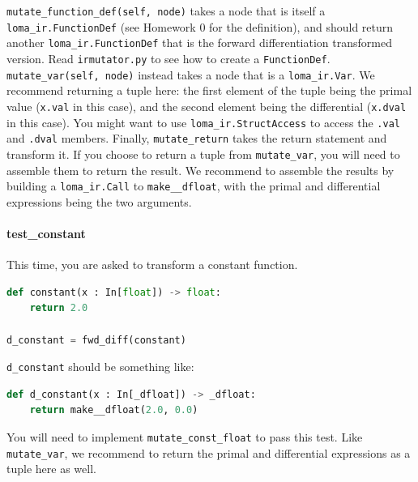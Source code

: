 \lstinline{mutate_function_def(self, node)} takes a node that is itself a \lstinline{loma_ir.FunctionDef} (see Homework 0 for the definition), and should return another \lstinline{loma_ir.FunctionDef} that is the forward differentiation transformed version. Read \lstinline{irmutator.py} to see how to create a \lstinline{FunctionDef}. \lstinline{mutate_var(self, node)} instead takes a node that is a \lstinline{loma_ir.Var}. We recommend returning a tuple here: the first element of the tuple being the primal value (\lstinline{x.val} in this case), and the second element being the differential (\lstinline{x.dval} in this case). You might want to use \lstinline{loma_ir.StructAccess} to access the \lstinline{.val} and \lstinline{.dval} members. Finally, \lstinline{mutate_return} takes the return statement and transform it. If you choose to return a tuple from \lstinline{mutate_var}, you will need to assemble them to return the result. We recommend to assemble the results by building a \lstinline{loma_ir.Call} to \lstinline{make__dfloat}, with the primal and differential expressions being the two arguments.

\paragraph{test_constant} This time, you are asked to transform a constant function.
\begin{lstlisting}[language=Python]
def constant(x : In[float]) -> float:
    return 2.0

d_constant = fwd_diff(constant)
\end{lstlisting}
\lstinline{d_constant} should be something like:
\begin{lstlisting}[language=Python]
def d_constant(x : In[_dfloat]) -> _dfloat:
    return make__dfloat(2.0, 0.0)
\end{lstlisting}
You will need to implement \lstinline{mutate_const_float} to pass this test. Like \lstinline{mutate_var}, we recommend to return the primal and differential expressions as a tuple here as well.

